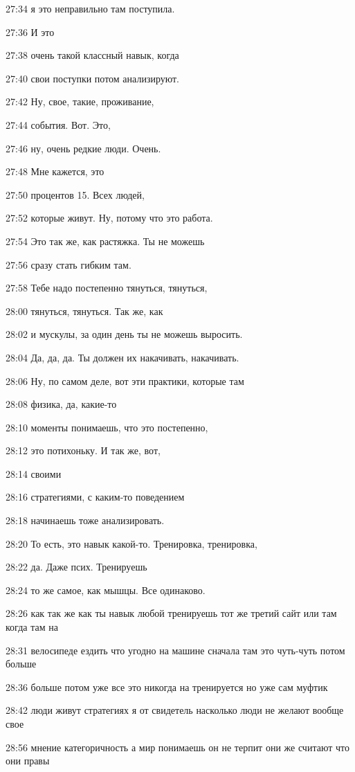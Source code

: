 27:34
я это неправильно там поступила.

27:36
И это

27:38
очень такой классный навык, когда

27:40
свои поступки потом анализируют.

27:42
Ну, свое, такие, проживание,

27:44
события. Вот. Это,

27:46
ну, очень редкие люди. Очень.

27:48
Мне кажется, это

27:50
процентов 15. Всех людей,

27:52
которые живут. Ну, потому что это работа.

27:54
Это так же, как растяжка. Ты не можешь

27:56
сразу стать гибким там.

27:58
Тебе надо постепенно тянуться, тянуться,

28:00
тянуться, тянуться. Так же, как

28:02
и мускулы, за один день ты не можешь выросить.

28:04
Да, да, да. Ты должен их накачивать, накачивать.

28:06
Ну, по самом деле, вот эти практики, которые там

28:08
физика, да, какие-то

28:10
моменты понимаешь, что это постепенно,

28:12
это потихоньку. И так же, вот,

28:14
своими

28:16
стратегиями, с каким-то поведением

28:18
начинаешь тоже анализировать.

28:20
То есть, это навык какой-то. Тренировка, тренировка,

28:22
да. Даже псих. Тренируешь

28:24
то же самое, как мышцы. Все одинаково.

28:26
как так же как ты навык любой тренируешь тот же третий сайт или там когда там на

28:31
велосипеде ездить что угодно на машине сначала там это чуть-чуть потом больше

28:36
больше потом уже все это никогда на тренируется но уже сам муфтик

28:42
люди живут стратегиях я от свидетель насколько люди не желают вообще свое

28:56
мнение категоричность а мир понимаешь он не терпит они же считают что они правы

